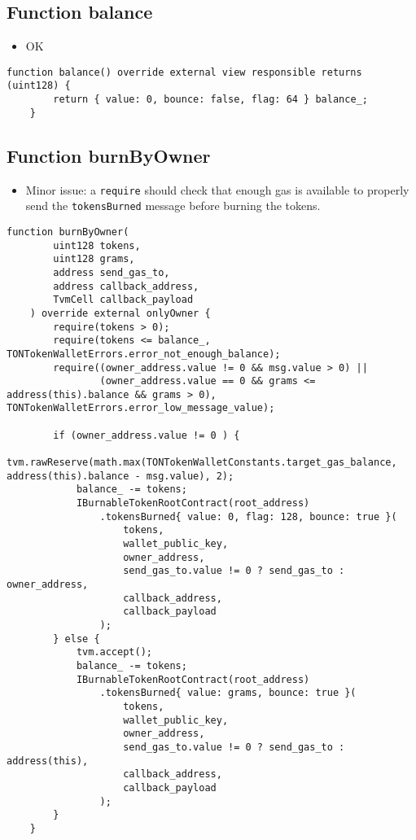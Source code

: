 \subsection{Function balance}

\begin{itemize}
\item OK
\end{itemize}

\begin{lstlisting}[firstnumber=58]
    function balance() override external view responsible returns (uint128) {
        return { value: 0, bounce: false, flag: 64 } balance_;
    }
\end{lstlisting}

\subsection{Function burnByOwner}

\begin{itemize}
\item Minor issue: a {\tt require} should check that enough gas is
  available to properly send the {\tt tokensBurned} message before
  burning the tokens.
\end{itemize}

\begin{lstlisting}[firstnumber=473]
    function burnByOwner(
        uint128 tokens,
        uint128 grams,
        address send_gas_to,
        address callback_address,
        TvmCell callback_payload
    ) override external onlyOwner {
        require(tokens > 0);
        require(tokens <= balance_, TONTokenWalletErrors.error_not_enough_balance);
        require((owner_address.value != 0 && msg.value > 0) ||
                (owner_address.value == 0 && grams <= address(this).balance && grams > 0), TONTokenWalletErrors.error_low_message_value);

        if (owner_address.value != 0 ) {
            tvm.rawReserve(math.max(TONTokenWalletConstants.target_gas_balance, address(this).balance - msg.value), 2);
            balance_ -= tokens;
            IBurnableTokenRootContract(root_address)
                .tokensBurned{ value: 0, flag: 128, bounce: true }(
                    tokens,
                    wallet_public_key,
                    owner_address,
                    send_gas_to.value != 0 ? send_gas_to : owner_address,
                    callback_address,
                    callback_payload
                );
        } else {
            tvm.accept();
            balance_ -= tokens;
            IBurnableTokenRootContract(root_address)
                .tokensBurned{ value: grams, bounce: true }(
                    tokens,
                    wallet_public_key,
                    owner_address,
                    send_gas_to.value != 0 ? send_gas_to : address(this),
                    callback_address,
                    callback_payload
                );
        }
    }
\end{lstlisting}

